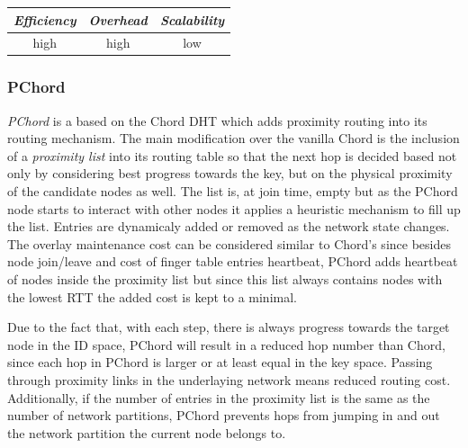 \begin{center}
\begin{tabular}{ccc}
\emph{Efficiency} & \emph{Overhead} & \emph{Scalability} \\
\hline
high &
high &
low
\end{tabular}
\end{center}

\subsubsection{PChord}
\emph{PChord}\cite{HLYW2005} is a based on the Chord DHT which adds
proximity routing into its routing mechanism. The main modification over the
vanilla Chord is the inclusion of a \emph{proximity list} into its routing table
so that the next hop is decided based not only by considering best progress
towards the key, but on the physical proximity of the candidate nodes as well.
The list is, at join time, empty but as the PChord node starts to interact with
other nodes it applies a heuristic mechanism to fill up the list. Entries are
dynamicaly added or removed as the network state changes. The overlay
maintenance cost can be considered similar to Chord's since besides node
join/leave and cost of finger table entries heartbeat, PChord adds heartbeat of
nodes inside the proximity list but since this list always contains nodes with
the lowest RTT the added cost is kept to a minimal.

Due to the fact that, with each step, there is always progress towards the
target node in the ID space, PChord will result in a reduced hop number than
Chord, since each hop in PChord is larger or at least equal in the key space.
Passing through proximity links in the underlaying network means reduced routing
cost. Additionally, if the number of entries in the proximity list is the same
as the number of network partitions, PChord prevents hops from jumping in and
out the network partition the current node belongs to.

